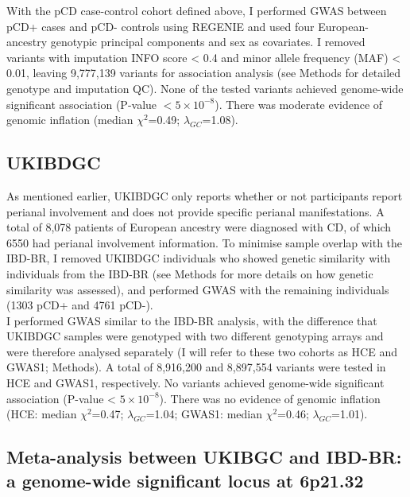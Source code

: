 With the pCD case-control cohort defined above, I performed GWAS between pCD+ cases and pCD- controls using REGENIE and used four European-ancestry genotypic principal components and sex as covariates. I removed variants with imputation INFO score < 0.4 and minor allele frequency (MAF) < 0.01, leaving 9,777,139 variants for association analysis (see Methods for detailed genotype and imputation QC). None of the tested variants achieved genome-wide significant association (P-value $< 5\times10^{-8}$). There was moderate evidence of genomic inflation (median $\chi^{2}$=0.49; $\lambda_{GC}$=1.08).
\subsection{UKIBDGC}
As mentioned earlier, UKIBDGC only reports whether or not participants report perianal involvement and does not provide specific perianal manifestations. A total of 8,078 patients of European ancestry were diagnosed with CD, of which 6550 had perianal involvement information. To minimise sample overlap with the IBD-BR, I removed UKIBDGC individuals who showed genetic similarity with individuals from the IBD-BR (see Methods for more details on how genetic similarity was assessed), and performed GWAS with the remaining individuals (1303 pCD+ and 4761 pCD-). \\

I performed GWAS similar to the IBD-BR analysis, with the difference that UKIBDGC samples were genotyped with two different genotyping arrays and were therefore analysed separately (I will refer to these two cohorts as HCE and GWAS1; Methods). A total of 8,916,200 and 8,897,554 variants were tested in HCE and GWAS1, respectively. No variants achieved genome-wide significant association (P-value < $5\times10^{-8}$). There was no evidence of genomic inflation (HCE: median $\chi^{2}$=0.47; $\lambda_{GC}$=1.04; GWAS1: median $\chi^{2}$=0.46; $\lambda_{GC}$=1.01).

\subsection{Meta-analysis between UKIBGC and IBD-BR: a genome-wide significant locus at 6p21.32}

